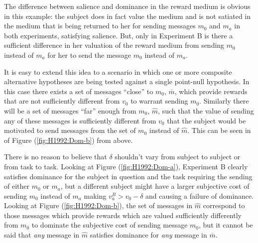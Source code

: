 \documentclass[../main.tex]{subfiles}
\begin{document}
The difference between salience and dominance in the reward medium is obvious in this example: the subject does in fact value the medium and is not satiated in the medium that is being returned to her for sending messages $m_0$ and $m_a$ in both experiments, satisfying salience.
But, only in Experiment B is there a sufficient difference in her valuation of the reward medium from sending $m_0$ instead of $m_a$ for her to send the message $m_0$ instead of $m_a$.


It is easy to extend this idea to a scenario in which one or more composite alternative hypotheses are being tested against a single point-null hypothesis.
In this case there exists a set of messages \enquote{close} to $m_0$, $\overbar{m}$, which provide rewards that are not sufficiently different from $v_0$ to warrant sending $m_0$.
Similarly there will be a set of messages \enquote{far} enough from $m_0$, $\hat{m}$, such that the value of sending any of these messages is sufficiently different from $v_0$ that the subject would be motivated to send messages from the set of $m_0$ instead of $\hat{m}$.
This can be seen in of Figure (\ref{fig:H1992:Dom-b}) from \textcite{Harrison1992} above.

There is no reason to believe that $\delta$ shouldn't vary from subject to subject or from task to task.
Looking at Figure (\ref{fig:H1992:Dom-a}), Experiment B clearly satisfies dominance for the subject in question and the task requiring the sending of either $m_0$ or $m_a$, but a different subject might have a larger subjective cost of sending $m_0$ instead of $m_a$ making $v_a^B > v_0 - \delta$ and causing a failure of dominance.
Looking at Figure (\ref{fig:H1992:Dom-b}), the set of messages in $\hat{m}$ correspond to those messages which provide rewards which are valued sufficiently differently from $m_0$ to dominate the subjective cost of sending message $m_0$, but it cannot be said that \textit{any} message in $\hat{m}$ satisfies dominance for \textit{any} message in $\bar{m}$.
\end{document}

